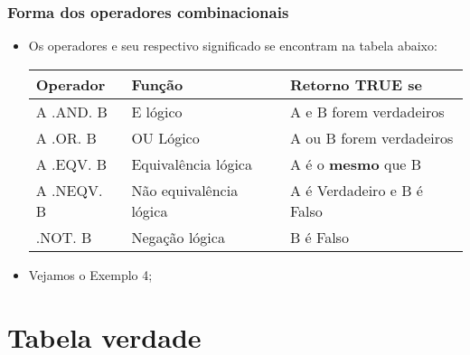 \documentclass[xcolor=table]{beamer}
\newenvironment{stepitemize}{\begin{itemize}[<+->]}{\end{itemize} }
\begin{document}
\begin{frame}%

\frametitle{Forma dos operadores combinacionais}

\begin{stepitemize}
\item Os operadores e seu respectivo significado se encontram na tabela abaixo:

\begin{table}
	\begin{center}
		\begin{adjustbox}{max width=.9\textwidth}
			\begin{tabular}{lll}
				\rowcolor{Maroon}
				Operador & Fun\c{c}\~{a}o & Retorno TRUE se \\ 
				\hline
				\rowcolor{Maroon!50}
				A .AND. B & E l\'{o}gico & A e B forem verdadeiros \\
				\rowcolor{Maroon!10} 
				A .OR. B & OU L\'{o}gico & A ou B forem verdadeiros \\ 
				\rowcolor{Maroon!50}
				A .EQV. B & Equival\^{e}ncia l\'{o}gica & A \'{e} o \textbf{mesmo} que B \\ 
				\rowcolor{Maroon!10} 
				A .NEQV. B & N\~{a}o equival\^{e}ncia l\'{o}gica & A \'{e} Verdadeiro e B 
				\'{e} Falso \\ 
				\rowcolor{Maroon!50}
				.NOT. B & Nega\c{c}\~{a}o l\'{o}gica & B \'{e} Falso%
			\end{tabular}
		\end{adjustbox}
	\end{center}
\end{table}
\item Vejamos o Exemplo 4;
\end{stepitemize}

\transboxout%
\end{frame}%

\section{Tabela verdade}
\end{document}

